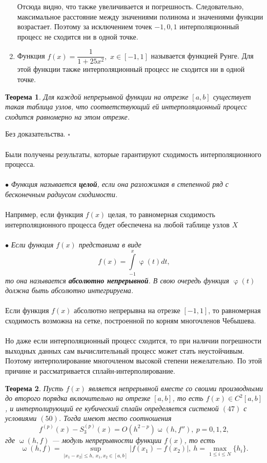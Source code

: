 \documentclass[a4paper, 12pt]{report}
\numberwithin{equation}{section}
\newenvironment{Proof} %
{\par\noindent{$\blacklozenge$}} %
{\hfill$\scriptstyle\square$}
\renewcommand{\leq}{\leqslant}
\renewcommand{\varphi}{\upvarphi}
\renewcommand{\omega}{\upomega}
\newtheorem*{theorem}{Теорема}
\begin{document}
\begin{enumerate}
$$		$$
		Отсюда видно, что также увеличивается и погрешность. Следовательно, максимальное расстояние между значениями полинома и значениями функции возрастает.
	 	Поэтому за исключением точек $-1, 0, 1$ интерполяционный процесс не сходится ни в одной точке.
	 	\item Функция $f(x) = \dfrac{1}{1 + 25x^2},$ $x \in [-1,1]$ называется функцией Рунге. Для этой функции также интерполяционный процесс не сходится ни в одной точке.
	 \end{enumerate}
	 \begin{theorem}
	 	Для каждой непрерывной функции на отрезке $[a,b]$ существует такая таблица узлов, что соответствующий ей интерполяционный процесс сходится равномерно на этом отрезке.
	 \end{theorem}
	 \begin{Proof}
	 	Без доказательства.
	 \end{Proof}\\\\
	 Были получены результаты, которые гарантируют сходимость интерполяционного процесса.\\\\
	 $\bullet$ \textit{Функция называется \textbf{целой}, если она разложимая в степенной ряд с бесконечным радиусом сходимости.}\\\\
	 Например, если функция $f(x)$ целая, то равномерная сходимость интерполяционного процесса будет обеспечена на любой таблице узлов $X$ \\\\
	 $\bullet$ \textit{Если функция $f(x)$ представима в виде $$f(x) = \int\limits_{-1}^x \varphi(t)dt,$$ то она называется \textbf{абсолютно непрерывной}. В свою очередь функция $\varphi(t)$ должна быть абсолютно интегрируема.}\\\\
	 Если функция $f(x)$ абсолютно непрерывна на отрезке $[-1, 1]$, то равномерная сходимость возможна на сетке, построенной по корням многочленов Чебышева.\\\\
	 Но даже если интерполяционный процесс сходится, то при наличии погрешности выходных данных сам вычислительный процесс может стать неустойчивым. Поэтому интерполирование многочленом высокой степени нежелательно. По этой причине и рассматривается сплайн-интерполирование.
	 \begin{theorem}
	 	Пусть $f(x)$ является непрерывной вместе со своими производными до второго порядка включительно на отрезке $[a,b]$, то есть $f(x) \in C^2[a,b]$, и интерполирующий ее кубический сплайн определяется системой $(47)$ с условиями $(50)$. Тогда имеют место соотношения 
	 	\begin{equation}
	 		f^{(p)}(x) - S_3^{(p)}(x) = O(h^{2-p})\omega (h, f''),\ p=0,1,2,
	 	\end{equation}
	 	где $\omega(h,f)$ --- модуль непрерывности функции $f(x)$, то есть $$\omega (h,f) = \underset{|x_1-x_2|\leq h,\ x_1,x_2 \in [a,b]}{\sup}|f(x_1) - f(x_2)|, \ h = \underset{1\leq i \leq N}{\max}\{h_i\}.$$
	 \end{theorem}
\end{document}

